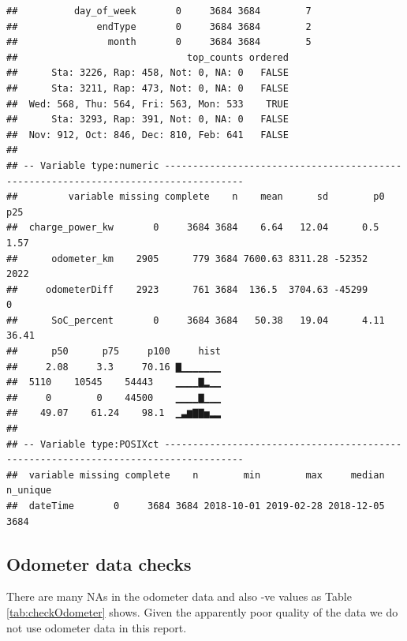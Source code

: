 \documentclass[]{article}
\newenvironment{Shaded}{\begin{snugshade}}{\end{snugshade}}
\newcommand{\DataTypeTok}[1]{\textcolor[rgb]{0.13,0.29,0.53}{#1}}
\newcommand{\DecValTok}[1]{\textcolor[rgb]{0.00,0.00,0.81}{#1}}
\newcommand{\ErrorTok}[1]{\textcolor[rgb]{0.64,0.00,0.00}{\textbf{#1}}}
\newcommand{\KeywordTok}[1]{\textcolor[rgb]{0.13,0.29,0.53}{\textbf{#1}}}
\newcommand{\NormalTok}[1]{#1}
\newcommand{\OperatorTok}[1]{\textcolor[rgb]{0.81,0.36,0.00}{\textbf{#1}}}
\newcommand{\StringTok}[1]{\textcolor[rgb]{0.31,0.60,0.02}{#1}}
\begin{document}
\begin{verbatim}
##          day_of_week       0     3684 3684        7
##              endType       0     3684 3684        2
##                month       0     3684 3684        5
##                              top_counts ordered
##      Sta: 3226, Rap: 458, Not: 0, NA: 0   FALSE
##      Sta: 3211, Rap: 473, Not: 0, NA: 0   FALSE
##  Wed: 568, Thu: 564, Fri: 563, Mon: 533    TRUE
##      Sta: 3293, Rap: 391, Not: 0, NA: 0   FALSE
##  Nov: 912, Oct: 846, Dec: 810, Feb: 641   FALSE
## 
## -- Variable type:numeric ------------------------------------------------------------------------------------
##         variable missing complete    n    mean      sd        p0     p25
##  charge_power_kw       0     3684 3684    6.64   12.04      0.5     1.57
##      odometer_km    2905      779 3684 7600.63 8311.28 -52352    2022   
##     odometerDiff    2923      761 3684  136.5  3704.63 -45299       0   
##      SoC_percent       0     3684 3684   50.38   19.04      4.11   36.41
##      p50      p75     p100     hist
##     2.08     3.3     70.16 ▇▁▁▁▁▁▁▁
##  5110    10545    54443    ▁▁▁▁▇▂▁▁
##     0        0    44500    ▁▁▁▁▇▁▁▁
##    49.07    61.24    98.1  ▁▃▆▇▇▅▂▂
## 
## -- Variable type:POSIXct ------------------------------------------------------------------------------------
##  variable missing complete    n        min        max     median n_unique
##  dateTime       0     3684 3684 2018-10-01 2019-02-28 2018-12-05     3684
\end{verbatim}

\hypertarget{odometer-data-checks}{%
\subsection{Odometer data checks}\label{odometer-data-checks}}

There are many NAs in the odometer data and also -ve values as Table \ref{tab:checkOdometer} shows. Given the apparently poor quality of the data we do not use odometer data in this report.

\begin{Shaded}
\end{Shaded}
\end{document}
